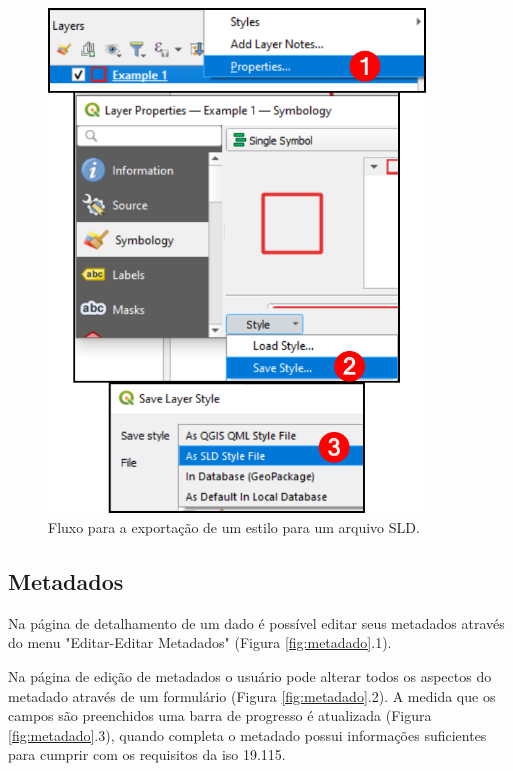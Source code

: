 \documentclass[12pt]{article}
\begin{document}
\begin{figure}[ht]
  \centering
  \includegraphics[width=10cm, keepaspectratio]{img/exportarsld.pdf}
  \caption{Fluxo para a exportação de um estilo para um arquivo SLD.}
  \label{fig:exportarsld}
\end{figure}

\subsection{Metadados}

Na página de detalhamento de um dado é possível editar seus metadados através
do menu "Editar-Editar Metadados" (Figura \ref{fig:metadado}.1). 

Na página de edição de metadados o usuário pode alterar todos os aspectos do
metadado através de um formulário (Figura \ref{fig:metadado}.2). A medida que os
campos são preenchidos uma barra de progresso é atualizada (Figura
\ref{fig:metadado}.3), quando completa o metadado possui informações suficientes
para cumprir com os requisitos da iso 19.115.
\end{document}

